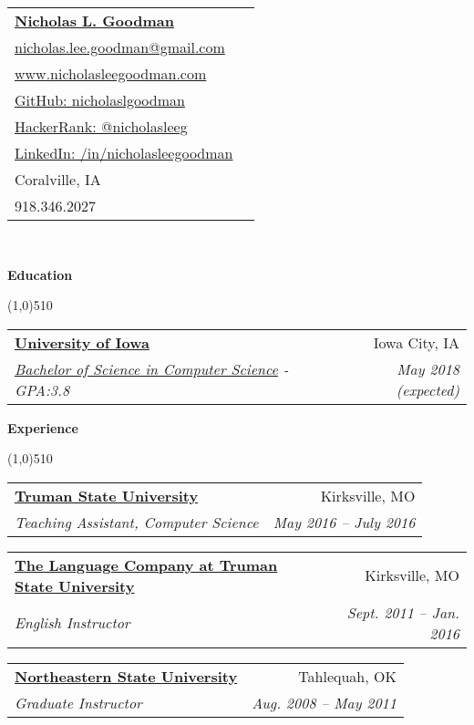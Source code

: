 \documentclass[letterpaper,11pt]{article}
\makeatletter
\newcommand{\resheading}[1]{{\large {\begin{minipage}{\textwidth}{\textbf{#1 \vphantom{p\^{E}}}}\end{minipage}}}}
\newcommand{\ressubheading}[4]{
\begin{tabular*}{6.5in}{l@{\extracolsep{\fill}}r}
		\textbf{#1} & #2 \\
		\textit{#3} & \textit{#4} \\
\end{tabular*}\vspace{-6pt}}
\makeatother
\begin{document}
\newcommand{\mywebheader}{
\begin{tabular*}{7in}{l@{\extracolsep{\fill}}r}
	\textbf{\href{http://www.nicholasleegoodman.com/}{\LARGE Nicholas L. Goodman}}\\
	\href{mailto:nicholas.lee.goodman@gmail.com}{nicholas.lee.goodman@gmail.com}\\
	\href{http://www.nicholasleegoodman.com}{www.nicholasleegoodman.com} \\ 
	\href{https://github.com/nicholaslgoodman}{GitHub: nicholaslgoodman} \\
	\href{https://www.hackerrank.com/nicholasleeg}{HackerRank: @nicholasleeg} \\ 
	\href{https://www.linkedin.com/in/nicholasleegoodman}{LinkedIn: /in/nicholasleegoodman} \\
	
	{Coralville, IA} \\
	{918.346.2027}
	\end{tabular*}
\\
\renewcommand{\labelitemi}{$-$}

\vspace{0.1in}}

\mywebheader



\resheading {Education}

\line(1,0){510}

	\begin{description}

		\item
			\ressubheading {
			\href{http://www.truman.edu}{University of Iowa}}{Iowa City, IA}
			{\href{http://www.truman.edu/majors-programs/majors-minors/computer-science-major/}{Bachelor of Science in Computer Science} - GPA:3.8}
			{ \footnotesize{May 2018 (expected)}}

		\end{description} %





\resheading{Experience}

\line(1,0){510}
	\begin{description}
	
			\item 
			\ressubheading{\href{http://www.truman.edu}{Truman State University }}{Kirksville, MO}
				{Teaching Assistant, Computer Science}{ \footnotesize{May 2016 -- July 2016}}


		\item 
			\ressubheading{\href{http://www.thelanguagecompany.com}{The Language Company at Truman State University}}{Kirksville, MO}
				{English Instructor}{ \footnotesize{Sept. 2011 -- Jan. 2016}}

		\item
			\ressubheading{\href{http://www.nsuok.edu}{Northeastern State University}}{Tahlequah, OK}
				{Graduate Instructor}{ \footnotesize{Aug. 2008 -- May 2011}}


	\end{description}  %
\end{document}
